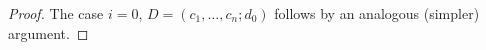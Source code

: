 \documentclass[a4paper,10pt
,draft
]{article}%
\renewcommand{\F}{\mathcal F}
\renewcommand{\1}{\eta}%
\begin{document}
\begin{proof}
      
      The case $i = 0$, $D = (c_1, \dots, c_n; d_0)$ follows by an analogous (simpler) argument.


\end{proof}
\end{document}
